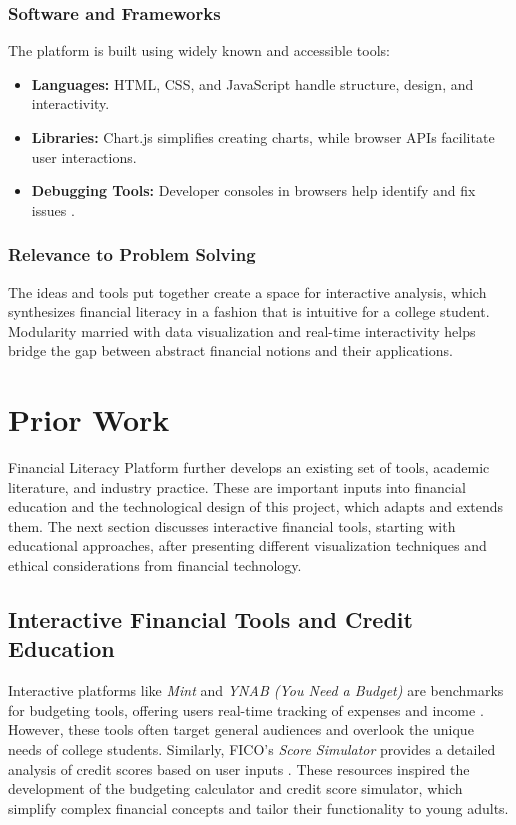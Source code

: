 \documentclass[11pt,twocolumn]{article}
\begin{document}
\subsubsection{Software and Frameworks}
The platform is built using widely known and accessible tools:
\begin{itemize}
    \item \textbf{Languages:} HTML, CSS, and JavaScript handle structure, design, and interactivity.
    \item \textbf{Libraries:} Chart.js simplifies creating charts, while browser APIs facilitate user interactions.
    \item \textbf{Debugging Tools:} Developer consoles in browsers help identify and fix issues \cite{developer_tools}.
\end{itemize}


\subsubsection{Relevance to Problem Solving}
The ideas and tools put together create a space for interactive analysis, which synthesizes financial literacy in a fashion that is intuitive for a college student. Modularity married with data visualization and real-time interactivity helps bridge the gap between abstract financial notions and their applications.


\section{Prior Work}

Financial Literacy Platform further develops an existing set of tools, academic literature, and industry practice. These are important inputs into financial education and the technological design of this project, which adapts and extends them. The next section discusses interactive financial tools, starting with educational approaches, after presenting different visualization techniques and ethical considerations from financial technology.

\subsection{Interactive Financial Tools and Credit Education}
Interactive platforms like \textit{Mint} and \textit{YNAB (You Need a Budget)} are benchmarks for budgeting tools, offering users real-time tracking of expenses and income \cite{mint}. However, these tools often target general audiences and overlook the unique needs of college students. Similarly, FICO’s \textit{Score Simulator} provides a detailed analysis of credit scores based on user inputs \cite{fico}. These resources inspired the development of the budgeting calculator and credit score simulator, which simplify complex financial concepts and tailor their functionality to young adults. 
\end{document}
